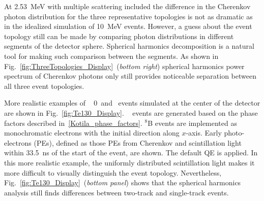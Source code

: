 At 2.53~MeV with multiple scattering included the difference in the Cherenkov photon distribution for the three representative topologies 
is not as dramatic as in the idealized simulation of 10~MeV events. However, a guess about the event topology still can be made by comparing 
photon distributions in different segments of the detector sphere. Spherical harmonics decomposition is a natural tool for making such 
comparison between the segments. As shown in Fig.~\ref{fig:ThreeTopologies_Display}~(\emph{bottom right}) spherical harmonics power spectrum 
of Cherenkov photons only still provides noticeable separation between all three event topologies.

More realistic examples of \Te~ 0\nbb~and \B~events simulated at the center of the detector are shown in Fig.~\ref{fig:Te130_Display}. 
\Te~ events are generated based on the phase factors described in~\ref{Kotila_phase_factors}.
$^{8}$B events are implemented as monochromatic electrons with the initial direction along $x$-axis.
Early photo-electrons (PEs), defined as those PEs from Cherenkov and scintillation light within 33.5~ns of the start of the event, are shown. 
The default QE is applied.  In this more realistic example, the uniformly distributed scintillation light makes it more difficult to 
visually distinguish the event topology. Nevertheless, Fig.~\ref{fig:Te130_Display}~(\emph{bottom panel}) shows that the spherical harmonics
analysis still finds differences between two-track and single-track events.

